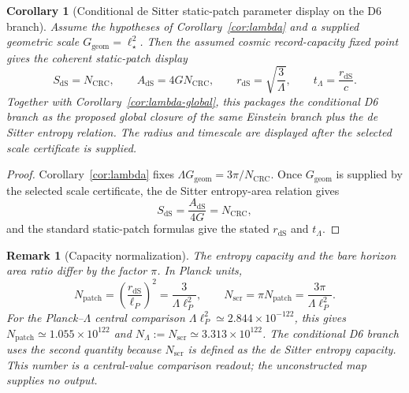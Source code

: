 \documentclass[11pt]{article}
\newtheorem{corollary}[theorem]{Corollary}
\newtheorem{remark}[theorem]{Remark}
\begin{document}
\begin{corollary}[Conditional de Sitter static-patch parameter display on the D6 branch]\label{cor:lambda-parameters}
Assume the hypotheses of Corollary~\ref{cor:lambda} and a supplied geometric scale
\(G_{\mathrm{geom}}=\ell_\star^2\). Then the assumed cosmic record-capacity fixed point gives the
coherent static-patch display
\[
S_{\mathrm{dS}}=N_{\mathrm{CRC}},
\qquad
A_{\mathrm{dS}}=4G N_{\mathrm{CRC}},
\qquad
r_{\mathrm{dS}}=\sqrt{\frac{3}{\Lambda}},
\qquad
t_\Lambda=\frac{r_{\mathrm{dS}}}{c}.
\]
Together with Corollary~\ref{cor:lambda-global}, this packages the conditional D6 branch as the proposed global closure
of the same Einstein branch plus the de Sitter entropy relation. The radius and timescale are
displayed after the selected scale certificate is supplied.
\end{corollary}

\begin{proof}
Corollary~\ref{cor:lambda} fixes \(\Lambda G_{\mathrm{geom}}=3\pi/N_{\mathrm{CRC}}\). Once
\(G_{\mathrm{geom}}\) is supplied by the selected scale certificate, the de Sitter entropy-area relation gives
\[
S_{\mathrm{dS}}=\frac{A_{\mathrm{dS}}}{4G}=N_{\mathrm{CRC}},
\]
and the standard static-patch formulas give the stated \(r_{\mathrm{dS}}\) and \(t_\Lambda\).
\end{proof}

\begin{remark}[Capacity normalization]\label{rem:lambda-capacity-normalization}
The entropy capacity and the bare horizon area ratio differ by the factor \(\pi\). In Planck units,
\[
N_{\mathrm{patch}}=\left(\frac{r_{\mathrm{dS}}}{\ell_P}\right)^2
=\frac{3}{\Lambda\ell_P^2},
\qquad
N_{\mathrm{scr}}=\pi N_{\mathrm{patch}}
=\frac{3\pi}{\Lambda\ell_P^2}.
\]
For the Planck--\(\Lambda\) central comparison \(\Lambda\ell_P^2\simeq2.844\times10^{-122}\), this gives
\(N_{\mathrm{patch}}\simeq1.055\times10^{122}\) and
\(N_{\Lambda}:=N_{\mathrm{scr}}\simeq3.313\times10^{122}\). The conditional D6 branch uses the
second quantity because \(N_{\mathrm{scr}}\) is defined as the de Sitter entropy capacity. This
number is a central-value comparison readout; the unconstructed map supplies no output.
\end{remark}
\end{document}

